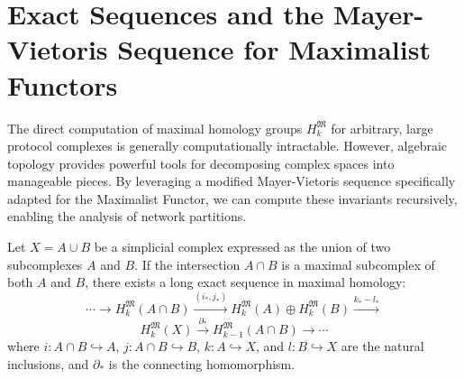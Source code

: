 \section{Exact Sequences and the Mayer-Vietoris Sequence for Maximalist Functors}

The direct computation of maximal homology groups $H_k^{\mathfrak{M}}$ for arbitrary, large protocol complexes is generally computationally intractable. However, algebraic topology provides powerful tools for decomposing complex spaces into manageable pieces. By leveraging a modified Mayer-Vietoris sequence specifically adapted for the Maximalist Functor, we can compute these invariants recursively, enabling the analysis of network partitions.

\begin{theorem}
Let $X = A \cup B$ be a simplicial complex expressed as the union of two subcomplexes $A$ and $B$. If the intersection $A \cap B$ is a maximal subcomplex of both $A$ and $B$, there exists a long exact sequence in maximal homology:
\[
\cdots \to H_k^{\mathfrak{M}}(A \cap B) \xrightarrow{(i_*, j_*)} H_k^{\mathfrak{M}}(A) \oplus H_k^{\mathfrak{M}}(B) \xrightarrow{k_* - l_*}\]
\[ H_k^{\mathfrak{M}}(X) \xrightarrow{\partial_*} H_{k-1}^{\mathfrak{M}}(A \cap B) \to \cdots
\]
where $i: A \cap B \hookrightarrow A$, $j: A \cap B \hookrightarrow B$, $k: A \hookrightarrow X$, and $l: B \hookrightarrow X$ are the natural inclusions, and $\partial_*$ is the connecting homomorphism.
\end{theorem}

